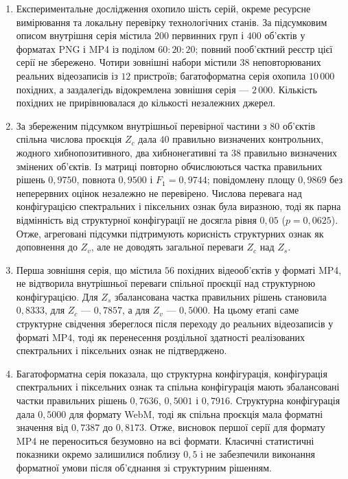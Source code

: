 \begin{enumerate}[label=\arabic*.]
\item Експериментальне дослідження охопило шість серій, окреме ресурсне вимірювання та локальну перевірку технологічних станів. За підсумковим описом внутрішня серія містила $200$ первинних груп і $400$ об’єктів у форматах PNG і MP4 із поділом $60:20:20$; повний пооб’єктний реєстр цієї серії не збережено. Чотири зовнішні набори містили $38$ неповторюваних реальних відеозаписів із $12$ пристроїв; багатоформатна серія охопила $10\,000$ похідних, а заздалегідь відокремлена зовнішня серія --- $2\,000$. Кількість похідних не прирівнювалася до кількості незалежних джерел.

\item За збереженим підсумком внутрішньої перевірної частини з $80$ об’єктів спільна числова проєкція $Z_c$ дала $40$ правильно визначених контрольних, жодного хибнопозитивного, два хибнонегативні та $38$ правильно визначених змінених об’єктів. Із матриці повторно обчислюються частка правильних рішень $0{,}9750$, повнота $0{,}9500$ і $F_1=0{,}9744$; повідомлену площу $0{,}9869$ без неперервних оцінок незалежно не перевірено. Числова перевага над конфігурацією спектральних і піксельних ознак була виразною, тоді як парна відмінність від структурної конфігурації не досягла рівня $0{,}05$ ($p=0{,}0625$). Отже, агреговані підсумки підтримують корисність структурних ознак як доповнення до $Z_v$, але не доводять загальної переваги $Z_c$ над $Z_s$.

\item Перша зовнішня серія, що містила $56$ похідних відеооб’єктів у форматі MP4, не відтворила внутрішньої переваги спільної проєкції над структурною конфігурацією. Для $Z_s$ збалансована частка правильних рішень становила $0{,}8333$, для $Z_c$ --- $0{,}7857$, а для $Z_v$ --- $0{,}5000$. На цьому етапі саме структурне свідчення збереглося після переходу до реальних відеозаписів у форматі MP4, тоді як перенесення роздільної здатності реалізованих спектральних і піксельних ознак не підтверджено.

\item Багатоформатна серія показала, що структурна конфігурація, конфігурація спектральних і піксельних ознак та спільна конфігурація мають збалансовані частки правильних рішень $0{,}7636$, $0{,}5001$ і $0{,}7916$. Структурна конфігурація дала $0{,}5000$ для формату WebM, тоді як спільна проєкція мала форматні значення від $0{,}7387$ до $0{,}8173$. Отже, висновок першої серії для формату MP4 не переноситься безумовно на всі формати. Класичні статистичні показники окремо залишилися поблизу $0{,}5$ і не забезпечили виконання форматної умови після об’єднання зі структурним рішенням.


\end{enumerate}
